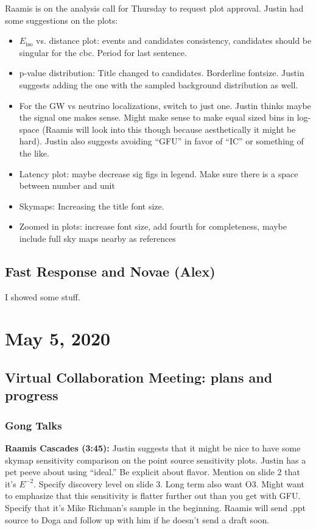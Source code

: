Raamis is on the analysis call for Thursday to request plot approval. Justin had some suggestions on the plots:
\begin{itemize}
    \item $E_{\mathrm{iso}}$ vs. distance plot: events and candidates consistency, candidates should be singular for the cbc. Period for last sentence.
    \item p-value distribution: Title changed to candidates. Borderline fontsize. Justin suggests adding the one with the sampled background distribution as well. 
    \item For the GW vs neutrino localizations, switch to just one. Justin thinks maybe the signal one makes sense. Might make sense to make equal sized bins in log-space (Raamis will look into this though because aesthetically it might be hard). Justin also suggests avoiding ``GFU'' in favor of ``IC'' or something of the like.
    \item Latency plot: maybe decrease sig figs in legend. Make sure there is a space between number and unit
    \item Skymaps: Increasing the title font size. 
    \item Zoomed in plots: increase font size, add fourth for completeness, maybe include full sky maps nearby as references
\end{itemize}

\section{Fast Response and Novae (Alex)}
I showed some stuff.

\chapter{May 5, 2020}
\section{Virtual Collaboration Meeting: plans and progress}
\subsection{Gong Talks}
\textbf{Raamis Cascades (3:45):} Justin suggests that it might be nice to have some skymap sensitivity comparison on the point source sensitivity plots. Justin has a pet peeve about using ``ideal.'' Be explicit about flavor. Mention on slide 2 that it's $E^{-2}$. Specify discovery level on slide 3. Long term also want O3. Might want to emphasize that this sensitivity is flatter further out than you get with GFU. Specify that it's Mike Richman's sample in the beginning. Raamis will send .ppt source to Doga and follow up with him if he doesn't send a draft soon.

